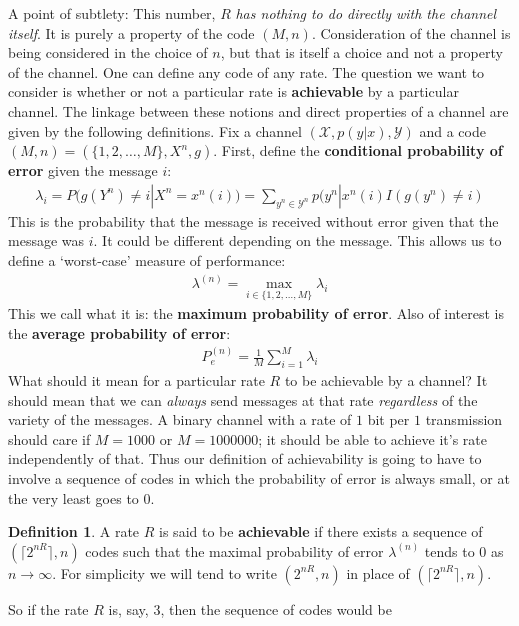 \documentclass{article}
\theoremstyle{definition}
\newtheorem{definition}{Definition}[section]
\theoremstyle{plain}
\begin{document}
A point of subtlety: This number, $R$ \emph{has nothing to do directly with the channel itself}. It is purely a property of the code $(M,n)$. Consideration of the channel is being considered in the choice of $n$, but that is itself a choice and not a property of the channel. One can define any code of any rate. The question we want to consider is whether or not a particular rate is \textbf{achievable} by a particular channel. The linkage between these notions and direct properties of a channel are given by the following definitions. Fix a channel $(\mathcal{X},p(y|x),\mathcal{Y})$ and a code $(M,n) = (\{1,2,\ldots,M\},X^n,g)$. First, define the \textbf{conditional probability of error} given the message $i$:
	\begin{align}
		\lambda_i = P(g(Y^n) \neq i | X^n=x^n(i)) = \sum_{y^n \in \mathcal{Y}^n} p(y^n|x^n(i)I(g(y^n)\neq i)
	\end{align}
This is the probability that the message is received without error given that the message was $i$. It could be different depending on the message. This allows us to define a `worst-case' measure of performance: 
	\begin{align}
		\lambda^{(n)} = \max_{i \in \{1,2,\ldots,M\}} \lambda_i
	\end{align}
This we call what it is: the \textbf{maximum probability of error}. Also of interest is the \textbf{average probability of error}:
	\begin{align}
		P_e^{(n)} = \frac{1}{M}\sum_{i=1}^M \lambda_i
	\end{align}
What should it mean for a particular rate $R$ to be achievable by a channel? It should mean that we can \emph{always} send messages at that rate \emph{regardless} of the variety of the messages. A binary channel with a rate of $1$ bit per $1$ transmission should care if $M = 1000$ or $M=1000000$; it should be able to achieve it's rate independently of that. Thus our definition of achievability is going to have to involve a sequence of codes in which the probability of error is always small, or at the very least goes to $0$.
\begin{definition}
 A rate $R$ is said to be \textbf{achievable} if there exists a sequence of $(\lceil 2^{nR} \rceil,n)$ codes such that the maximal probability of error $\lambda^{(n)}$ tends to $0$ as $n \to \infty$. For simplicity we will tend to write $(2^{nR},n)$ in place of $(\lceil 2^{nR} \rceil,n)$. 
\end{definition}
So if the rate $R$ is, say, $3$, then the sequence of codes would be 
\end{document}
